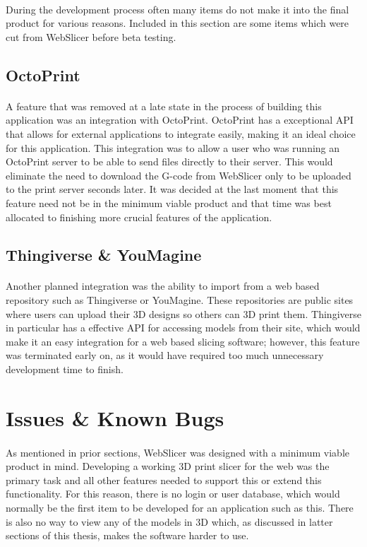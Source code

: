 \paragraph{}
During the development process often many items do not make it into the final product for various reasons.
Included in this section are some items which were cut from WebSlicer before beta testing.

\subsection{OctoPrint}
\paragraph{}
A feature that was removed at a late state in the process of building this application was an integration with OctoPrint.
OctoPrint has a exceptional API that allows for external applications to integrate easily, making it an ideal choice for this application.
This integration was to allow a user who was running an OctoPrint server to be able to send files directly to their server.
This would eliminate the need to download the G-code from WebSlicer only to be uploaded to the print server seconds later.
It was decided at the last moment that this feature need not be in the minimum viable product and that time was best allocated to finishing more crucial features of the application.

\subsection{Thingiverse \& YouMagine}
\paragraph{}
Another planned integration was the ability to import from a web based repository such as Thingiverse or YouMagine.
These repositories are public sites where users can upload their 3D designs so others can 3D print them.
Thingiverse in particular has a effective API for accessing models from their site, which would make it an easy integration for a web based slicing software;
however, this feature was terminated early on, as it would have required too much unnecessary development time to finish.

\section{Issues \& Known Bugs}
\paragraph{}
As mentioned in prior sections, WebSlicer was designed with a minimum viable product in mind.
Developing a working 3D print slicer for the web was the primary task and all other features needed to support this or extend this functionality.
For this reason, there is no login or user database, which would normally be the first item to be developed for an application such as this.
There is also no way to view any of the models in 3D which, as discussed in latter sections of this thesis, makes the software harder to use.
